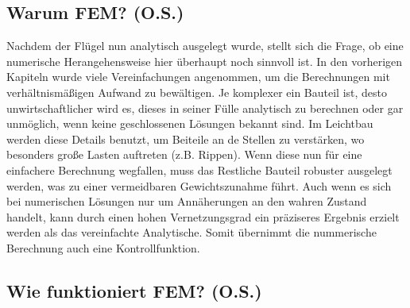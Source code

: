\subsection{Warum FEM? (O.S.)}
Nachdem der Flügel nun analytisch ausgelegt wurde, stellt sich die Frage, ob eine numerische Herangehensweise hier überhaupt noch sinnvoll ist. In den vorherigen Kapiteln wurde viele Vereinfachungen angenommen, um die Berechnungen mit verhältnismäßigen Aufwand zu bewältigen. Je komplexer ein Bauteil ist, desto unwirtschaftlicher wird es, dieses in seiner Fülle analytisch zu berechnen oder gar unmöglich, wenn keine geschlossenen Lösungen bekannt sind. Im Leichtbau werden diese Details benutzt, um Beiteile an de Stellen zu verstärken, wo besonders große Lasten auftreten (z.B. Rippen). Wenn diese nun für eine einfachere Berechnung wegfallen, muss das Restliche Bauteil robuster ausgelegt werden, was zu einer vermeidbaren Gewichtszunahme führt. Auch wenn es sich bei numerischen Lösungen nur um Annäherungen an den wahren Zustand handelt, kann durch einen hohen Vernetzungsgrad ein präziseres Ergebnis erzielt werden als das vereinfachte Analytische. Somit übernimmt die nummerische Berechnung auch eine Kontrollfunktion.
\subsection{Wie funktioniert FEM? (O.S.)}
